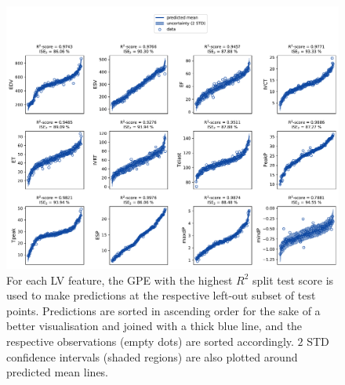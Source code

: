 \begin{figure}[ht!]
    \myfloatalign
    \includegraphics[width=\textwidth]{figures/chapter04/bgpes_vs_bsplit_sham.pdf}
    \caption{For each LV feature, the GPE with the highest $R^2$ split test score is used to make predictions at the respective left-out subset of test points. Predictions are sorted in ascending order for the sake of a better visualisation and joined with a thick blue line, and the respective observations (empty dots) are sorted accordingly. $2$ STD confidence intervals (shaded regions) are also plotted around predicted mean lines.}
    \label{fig:gpesexampleinferencesham}
\end{figure}


